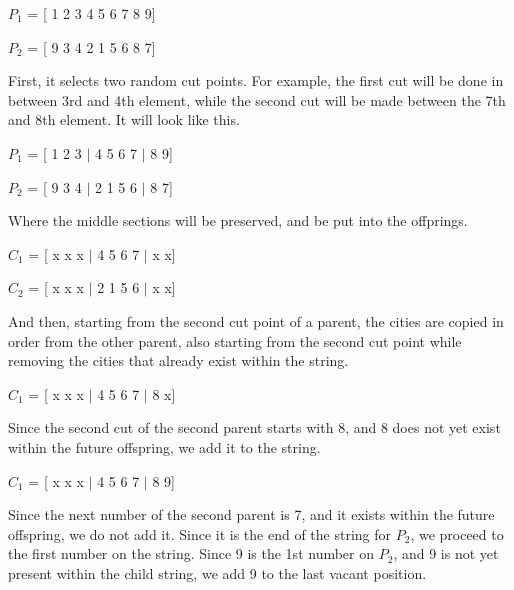 \hfill \par
$P_{1}$ = [ 1 2 3 4 5 6 7 8 9] \par 
$P_{2}$ = [ 9 3 4 2 1 5 6 8 7] \par
\hfill \par



First, it selects two random cut points. For example, the first cut will be done in between 3rd and 4th element, while the second cut will be made between the 7th and 8th element. It will look like this. \par 


\hfill \par
$P_{1}$ = [ 1 2 3 $|$ 4 5 6 7 $|$ 8 9] \par 
$P_{2}$ = [ 9 3 4 $|$ 2 1 5 6 $|$ 8 7] \par

\hfill \par 

Where the middle sections will be preserved, and be put into the offprings. \par 

\hfill \par 
$C_{1}$ = [ x x x $|$ 4 5 6 7 $|$ x x] \par 
$C_{2}$ = [ x x x $|$ 2 1 5 6 $|$ x x] \par 
\hfill \par


And then, starting from the second cut point of a parent, the cities are copied in order from the other parent, also starting from the second cut point while removing the cities that already exist within the string. 
\hfill \par 

\hfill \par 
$C_{1}$ = [ x x x $|$ 4 5 6 7 $|$ 8 x] \par 
\hfill \par
Since the second cut of the second parent starts with 8, and 8 does not yet exist within the future offspring, we add it to the string.

\hfill \par 
$C_{1}$ = [ x x x $|$ 4 5 6 7 $|$ 8 9] \par 
\hfill \par
Since the next number of the second parent is 7, and it exists within the future offspring, we do not add it. Since it is the end of the string for $P_2$, we proceed to  the first number on the string. Since 9 is the 1st number on $P_2$, and 9 is not yet present within the child string, we add 9 to the last vacant position.


